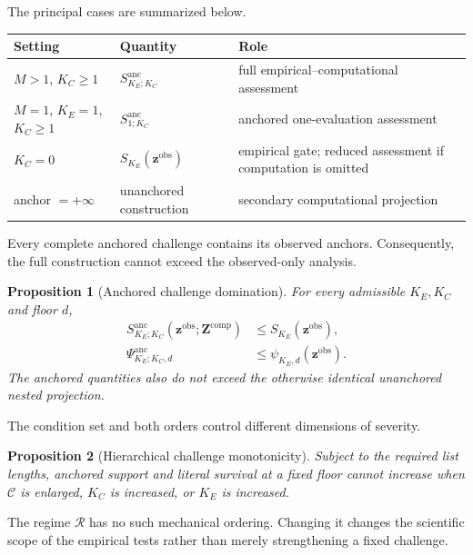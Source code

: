 \documentclass[11pt]{article}
\newcommand{\Regime}{\mathcal{R}}
\newcommand{\CSet}{\mathcal{C}}
\newcommand{\Sanc}{S^{\mathrm{anc}}}
\newcommand{\Psianc}{\Psi^{\mathrm{anc}}}
\newtheorem{proposition}{Proposition}
\theoremstyle{remark}
\begin{document}
The principal cases are summarized below.
\begin{center}
\begin{tabularx}{0.96\textwidth}{@{}lX X@{}}
\toprule
Setting & Quantity & Role \\
\midrule
$M>1$, $K_C\geq1$ & $\Sanc_{K_E;K_C}$ & full empirical--computational assessment \\
$M=1$, $K_E=1$, $K_C\geq1$ & $\Sanc_{1;K_C}$ & anchored one-evaluation assessment \\
$K_C=0$ & $S_{K_E}(\mathbf z^{\mathrm{obs}})$ & empirical gate; reduced assessment if computation is omitted \\
anchor $=+\infty$ & unanchored construction & secondary computational projection \\
\bottomrule
\end{tabularx}
\end{center}

Every complete anchored challenge contains its observed anchors. Consequently,
the full construction cannot exceed the observed-only analysis.

\begin{proposition}[Anchored challenge domination]
\label{prop:anchor-domination}
For every admissible $K_E,K_C$ and floor $d$,
\begin{align}
\Sanc_{K_E;K_C}
\left(\mathbf z^{\mathrm{obs}};\mathbf Z^{\mathrm{comp}}\right)
&\leq
S_{K_E}(\mathbf z^{\mathrm{obs}}),
\label{eq:magnitude-domination}\\
\Psianc_{K_E;K_C,d}
&\leq
\psi_{K_E,d}(\mathbf z^{\mathrm{obs}}).
\label{eq:survival-domination}
\end{align}
The anchored quantities also do not exceed the otherwise identical unanchored
nested projection.
\end{proposition}

The condition set and both orders control different dimensions of severity.

\begin{proposition}[Hierarchical challenge monotonicity]
\label{prop:monotonicity}
Subject to the required list lengths, anchored support and literal survival at
a fixed floor cannot increase when $\CSet$ is enlarged, $K_C$ is increased, or
$K_E$ is increased.
\end{proposition}

The regime $\Regime$ has no such mechanical ordering. Changing it changes the
scientific scope of the empirical tests rather than merely strengthening a
fixed challenge.
\end{document}
